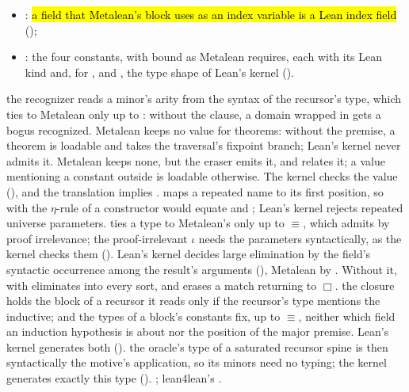 \begin{definition}
\begin{itemize}
        premise, the induction hypotheses of Metalean's block, each about the field at its Lean
        position, in Metalean's order;
  \item {}: \hl{a field that Metalean's block uses as an index variable is
        a Lean index field} ();
  \item {}: the four constants, with  bound as Metalean requires, each with its
        Lean kind and, for ,  and , the type shape of
        Lean's kernel ().
  \end{itemize}
   the recognizer reads a minor's arity from the syntax of the recursor's
  type, which  ties to Metalean only up to : without the clause, a domain
  wrapped in  gets a bogus  recognized.
   Metalean keeps no value for theorems: without the premise, a
  theorem  is loadable and takes the traversal's fixpoint branch; Lean's kernel never
  admits it.
   Metalean keeps none, but the eraser emits it, and 
  relates it; a value mentioning a constant outside  is loadable otherwise. The kernel
  checks the value (), and the translation implies .
    maps a repeated name to its first
  position, so with  the $\eta$-rule of a constructor would equate
   and ; Lean's kernel rejects repeated universe parameters.
    ties a type to Metalean's only up to
  $\equiv$, which admits  by proof irrelevance; the
  proof-irrelevant $\iota$ needs the parameters syntactically, as the kernel checks them
  ().
   Lean's kernel decides large elimination by the field's syntactic
  occurrence among the result's arguments (), Metalean by
  . Without it,  with 
  eliminates into every sort, and  erases a match returning  to $\Box$.
   the closure holds the block of a recursor it reads
  only if the recursor's type mentions the inductive; and the types of a block's constants fix,
  up to $\equiv$, neither which field an induction hypothesis is about nor the position of the
  major premise. Lean's kernel generates both ().
   the oracle's type of a saturated recursor spine is then
  syntactically the motive's application, so its minors need no typing; the kernel generates
  exactly this type ().
   ; lean4lean's .
\end{definition}

